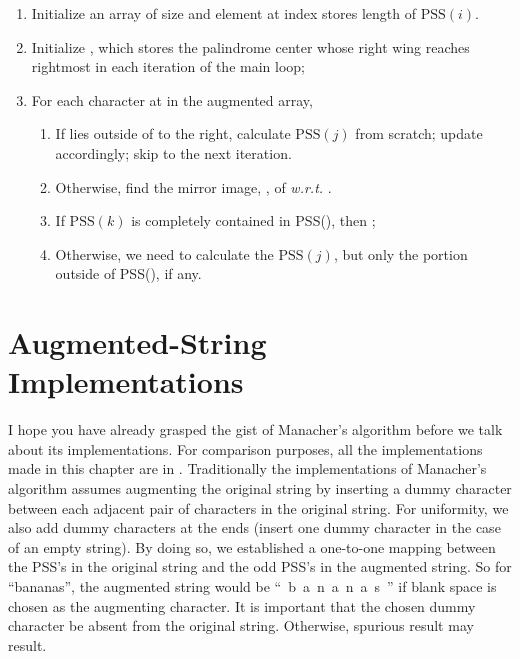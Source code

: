 \begin{alisting}[htb]
    \caption{\label{alg:lps-algorithm}
    Algorithm for the LPS problem based on Manacher's algorithm}
    \begin{enumerate}
        \item Initialize an array  of size  and element at index 
        stores length of $\mbox{PSS}(i)$.
        \item Initialize , which stores the palindrome center whose right wing
        reaches rightmost in each iteration of the main loop;
        \item For each character at  in the augmented array,
        \begin{enumerate}[label={\roman*:}]
            \item If  lies outside of  to the right,
            calculate $\mbox{PSS}(j)$ from scratch;
            update  accordingly;
            skip to the next iteration.
            \item Otherwise, find the mirror image, , of 
            \textit{w.r.t.} .
            \item If $\mbox{PSS}(k)$ is completely contained in \mbox{PSS()},
            then ;
            \item Otherwise, we need to calculate the $\mbox{PSS}(j)$, but only the portion
            outside of \mbox{PSS()}, if any.
        \end{enumerate}
    \end{enumerate}
\end{alisting}


\section{Augmented-String Implementations}\label{sec:implementation-lps-augmented}

I hope you have already grasped the gist of Manacher's algorithm before we talk about its
implementations.
For comparison purposes, all the implementations made in this chapter are in \java.
Traditionally the implementations of Manacher's algorithm assumes augmenting the original string
by inserting a dummy character between each adjacent pair of characters in the
original string.
For uniformity, we also add dummy characters at the ends (insert one dummy
character in the case of an empty string).
By doing so, we established a one-to-one mapping between the PSS's in the original string
and the odd PSS's in the augmented string.
So for \mbox{``bananas''}, the augmented string would be \mbox{`` b a n a n a s ''}
if blank space is chosen as the augmenting character.
It is important that the chosen dummy character be absent from the original string.
Otherwise, spurious result may result.


